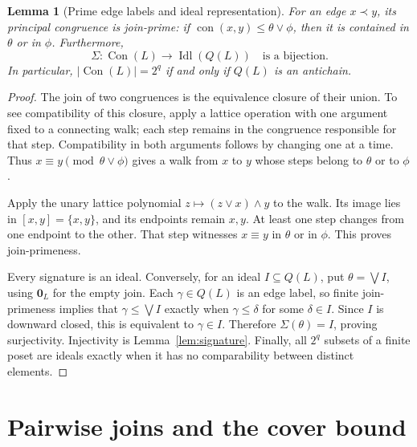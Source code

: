 \documentclass[11pt,a4paper]{article}
\numberwithin{equation}{section}
\newtheorem{lemma}[theorem]{Lemma}
\theoremstyle{definition}
\theoremstyle{remark}
\DeclareMathOperator{\Con}{Con}
\DeclareMathOperator{\con}{con}
\DeclareMathOperator{\Idl}{Idl}
\newcommand{\eqcon}{\mathbf 0_L}
\newcommand{\card}[1]{\lvert #1\rvert}
\begin{document}
\begin{lemma}[Prime edge labels and ideal representation]\label{lem:ideals}
For an edge $x\prec y$, its principal congruence is join-prime: if
$\con(x,y)\le\theta\vee\phi$, then it is contained in $\theta$ or in $\phi$.
Furthermore,
\begin{equation}\label{eq:ideal-representation}
 \Sigma:\Con(L)\longrightarrow\Idl(Q(L))
 \quad\text{is a bijection}.
\end{equation}
In particular, $\card{\Con(L)}=2^q$ if and only if $Q(L)$ is an antichain.
\end{lemma}
\begin{proof}
The join of two congruences is the equivalence closure of their union.
To see compatibility of this closure, apply a lattice operation with one argument
fixed to a connecting walk; each step remains in the congruence responsible for
that step. Compatibility in both arguments follows by changing one at a time.
Thus $x\equiv y\pmod{\theta\vee\phi}$ gives a walk from $x$ to $y$ whose steps
belong to $\theta$ or to $\phi$.

Apply the unary lattice polynomial $z\mapsto(z\vee x)\wedge y$ to the walk.
Its image lies in $[x,y]=\{x,y\}$, and its endpoints remain $x,y$.
At least one step changes from one endpoint to the other. That step witnesses
$x\equiv y$ in $\theta$ or in $\phi$. This proves join-primeness.

Every signature is an ideal. Conversely, for an ideal $I\subseteq Q(L)$, put
$\theta=\bigvee I$, using $\eqcon$ for the empty join.
Each $\gamma\in Q(L)$ is an edge label, so finite join-primeness implies that
$\gamma\le\bigvee I$ exactly when $\gamma\le\delta$ for some $\delta\in I$.
Since $I$ is downward closed, this is equivalent to $\gamma\in I$.
Therefore $\Sigma(\theta)=I$, proving surjectivity. Injectivity is
Lemma~\ref{lem:signature}.
Finally, all $2^q$ subsets of a finite poset are ideals exactly when it has no
comparability between distinct elements.
\end{proof}

\section{Pairwise joins and the cover bound}\label{sec:bound}
\end{document}
